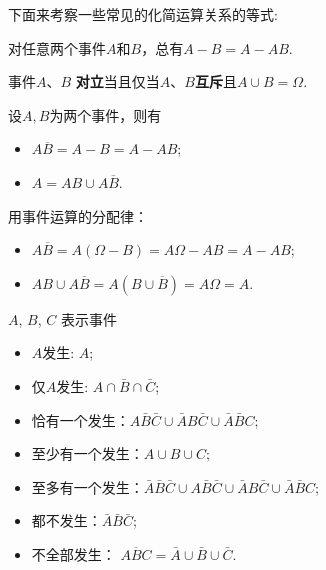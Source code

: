下面来考察一些常见的化简运算关系的等式: 

\begin{proposition}
        对任意两个事件$A$和$B$，总有$ A-B=A-AB$. 
\end{proposition}

\begin{proposition}
    事件$A$、$B$ \textbf{对立}当且仅当$A$、$B$\textbf{互斥}且$A\cup B=\Omega$. 
\end{proposition}
\begin{example}
    设$A,B$为两个事件，则有
        \begin{itemize}
            \item $A\overline{B}=A-B=A-AB$; 
            \item $A=AB\cup A\overline{B}$. 
        \end{itemize}
\end{example}

\begin{solution}
    用事件运算的分配律：
    \begin{itemize}
        \item $A\overline{B}=A(\Omega-B)=A\Omega-AB=A-AB$; 
        \item $AB\cup A\overline{B}=A(B\cup\overline{B})=A\Omega=A$. 
    \end{itemize}
\end{solution}

\begin{example}
    $A$, $B$, $C$ 表示事件
    \begin{itemize}
        \item $A$发生: $A$; 
        \item 仅$A$发生: $A\cap \bar{B}\cap \bar{C}$; 
        \item 恰有一个发生：$A \bar B \bar C\cup \bar AB\bar C\cup \bar A\bar BC$;
        \item 至少有一个发生：$A\cup B\cup C$;
        \item 至多有一个发生：$\bar A\bar B\bar C\cup A \bar B \bar C \cup \bar AB\bar C\cup \bar A\bar BC$;
        \item 都不发生：$\bar A\bar B\bar C$;
        \item 不全部发生： $\overline{ABC}=\bar A\cup \bar B\cup \bar C$.
    \end{itemize}
\end{example}

